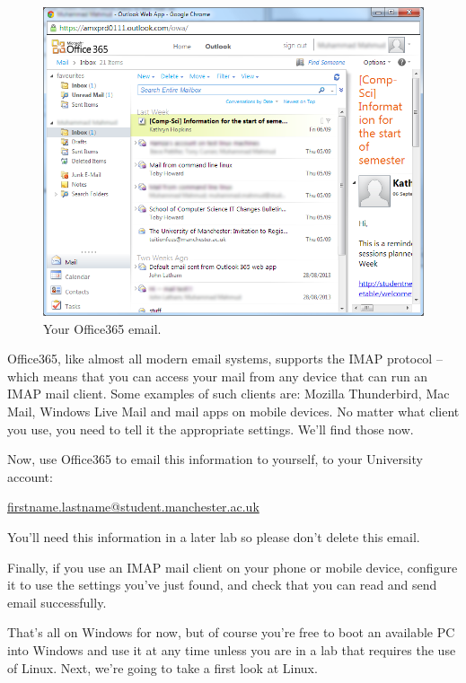\begin{figure}
\centerline{\includegraphics[width=15cm]{images/hamza-365-mail.png}}
\caption{Your Office365 email.}
\label{figure:welc-mail365}
\end{figure}

\label{sec:reading-your-mail}

Office365, like almost all modern email systems, supports the IMAP
protocol -- which means that you can access your mail from any device
that can run an IMAP mail client. Some examples of such clients are:
Mozilla Thunderbird, Mac Mail, Windows Live Mail and mail apps on mobile devices. No matter what
client you use, you need to tell it the appropriate settings. We'll find those now.

\splunge

Now, use Office365 to email this information to yourself, to your
University account:

\url{firstname.lastname@student.manchester.ac.uk}

You'll need this information in a later lab so please don't delete this email.

Finally, if you use an IMAP mail client on your phone or mobile
device, configure it to use the settings you've just found, and check
that you can read and send email successfully.

That's all on Windows for now, but of course  you're free to boot an available PC into Windows  and use it at any time unless you are in a lab that requires the use of Linux. Next, we're going to take a first look at Linux.

